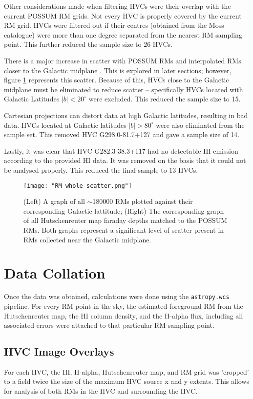 Other considerations made when filtering HVCs were their overlap with the current POSSUM RM grids. Not every HVC is properly covered by the current RM grid. HVCs were filtered out if their centres (obtained from the Moss catalogue) were more than one degree separated from the nearest RM sampling point. This further reduced the sample size to 26 HVCs.


There is a major increase in scatter with POSSUM RMs and interpolated RMs closer to the Galactic midplane \citep{ID21}. This is explored in later sections; however, figure \ref{fig:rm_scatter} represents this scatter. Because of this, HVCs close to the Galactic midplane must be eliminated to reduce scatter – specifically HVCs located with Galactic Latitudes $|b|<20^{\circ}$ were excluded. This reduced the sample size to 15.


Cartesian projections can distort data at high Galactic latitudes, resulting in bad data. HVCs located at Galactic latitudes $|b|>80^{\circ}$ were also eliminated from the sample set. This removed HVC G298.0-81.7+127 and gave a sample size of 14.

Lastly, it was clear that HVC G282.3-38.3+117 had no detectable HI emission according to the provided HI data. It was removed on the basis that it could not be analysed properly. This reduced the final sample to 13 HVCs.

\begin{figure}
    \texttt{[image: "RM\_whole\_scatter.png"]}
    \centering
    \caption{(Left) A graph of all $\sim$180000 RMs plotted against their corresponding Galactic lattitude; (Right) The corresponding graph of all Hutschenreuter map faraday depths matched to the POSSUM RMs. Both graphs represent a significant level of scatter present in RMs collected near the Galactic midplane.}
    \label{fig:rm_scatter}
\end{figure}

\section{Data Collation}
\label{sec:collation}

Once the data was obtained, calculations were done using the \verb|astropy.wcs| pipeline. For every RM point in the sky, the estimated foreground RM from the Hutschenreuter map, the HI column density, and the H-alpha flux, including all associated errors were attached to that particular RM sampling point.

\subsection{HVC Image Overlays}
\label{ssec:hvc_snapshot}

For each HVC, the HI, H-alpha, Hutschenreuter map, and RM grid was 'cropped' to a field twice the size of the maximum HVC source x and y extents. This allows for analysis of both RMs in the HVC and surrounding the HVC.


